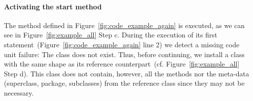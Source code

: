
\paragraph{Activating the start method}
The method  defined in Figure~\ref{fig:code_example_again} is executed, as we can see in Figure~\ref{fig:example_all} Step c. During the execution of its first statement~(Figure~\ref{fig:code_example_again} line 2) we detect a missing code unit failure: The  class does not exist. Thus, before continuing, we install a  class with the same shape as its reference counterpart~(cf. Figure~\ref{fig:example_all} Step d). This class does not contain, however, all the methods nor the meta-data (\eg superclass, package, subclasses) from the reference class since they may not be necessary.





